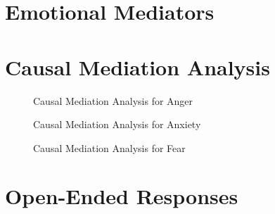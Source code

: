 \documentclass[]{article}
\begin{document}
\section{Emotional Mediators}



\section{Causal Mediation Analysis}

\usetikzlibrary{positioning}

\begin{figure}[H]
\caption{Causal Mediation Analysis for Anger}\vspace{.5em}
\centering
\vspace{2em}

\end{figure}

\begin{figure}[H]
\caption{Causal Mediation Analysis for Anxiety}\vspace{.5em}
\centering
\vspace{2em}

\end{figure}

\begin{figure}[H]
\caption{Causal Mediation Analysis for Fear}\vspace{.5em}
\centering
\vspace{2em}

\end{figure}

\section{Open-Ended Responses}



\end{document}

